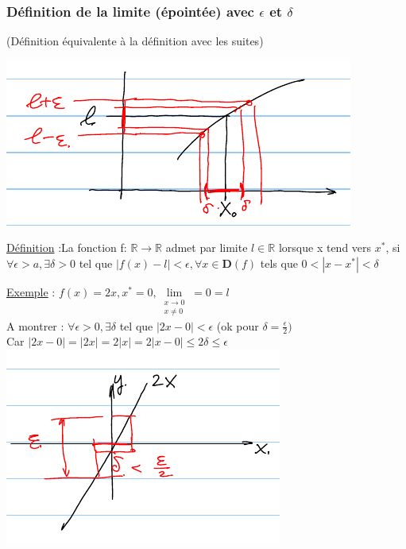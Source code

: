 \documentclass[12pt,a4paper]{article}
\newcommand{\limite}{\lim\limits_}
\newcommand{\R}{\ensuremath{\mathbb{R}} }
\newcommand{\rtor}{\ensuremath{\R \to \R} }
\newcommand{\Exemple}{\underline{Exemple} }
\newcommand{\Definition}{\underline{Définition} }
\begin{document}
{\subsubsection{Définition de la limite (épointée) avec $\epsilon$ et $\delta$}
(Définition équivalente à la définition avec les suites)\\
\begin{center}
\includegraphics[scale=0.5]{illustrations_Analyse/lim_epoint_epsilon}\\
\end{center}
\begin{boite}
\Definition :La fonction  f: \rtor admet par limite $l \in \R$ lorsque x tend vers $x^*$, si $\forall \epsilon > a, \exists \delta >0$ tel que $|f(x) - l| < \epsilon, \forall x \in \mathbf{D}(f)$ tels que $0 < |x-x^*| < \delta$
\end{boite}
\Exemple : $f(x) = 2x, x^* = 0, \limite{\substack{x \to 0 \\ x \neq 0}} = 0 = l$\\
A montrer : $\forall\epsilon > 0, \exists \delta$ tel que $|2x - 0| < \epsilon$ (ok pour $\delta = \frac{\epsilon}{2})$\\
Car $|2x-0| = |2x| = 2|x| = 2|x-0| \leq 2\delta \leq \epsilon$\\
\includegraphics[scale=0.5]{illustrations_Analyse/epsilon2x}

}
\end{document}

